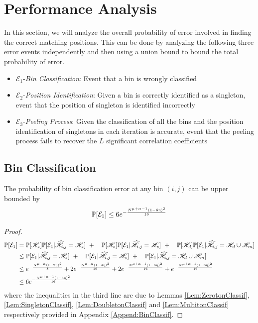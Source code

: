 \section{Performance Analysis}
\label{sec:analysis}
\def\vgap{2pt}
In this section, we will analyze the overall probability of error involved in finding the correct matching positions. This can be done by analyzing the following three error events independently and then using a union bound to bound the total probability of error.

\begin{itemize}
	\item $\mathcal{E}_1${-\it Bin Classification}: Event that a bin is wrongly classified
	\item $\mathcal{E}_2${-\it Position Identification}: Given a bin is correctly identified as a singleton, event that the position of singleton is identified incorrectly
	\item $\mathcal{E}_3${-\it Peeling Process}: Given the classification of all the bins and the position identification of singletons in each iteration is accurate, event that the peeling process fails to recover the $L$ significant correlation coefficients
\end{itemize}

\subsection{\bf Bin Classification}
\begin{lemma}
The probability of bin classification error at any bin $(i,j)$ can be upper bounded by
\begin{align*}
\mathbb{P}[\mathcal{E}_1]\leq 6e^{-\frac{N^{\mu+\alpha-1}(1-6\eta)^2}{16}}
\end{align*}
\end{lemma}

\begin{proof}
\begin{align*}
\mathbb{P}[\mathcal{E}_1]&=\mathbb{P}[\mathscr{H}_z]\mathbb{P}[\mathcal{E}_1|\widehat{\mathscr{H}}_{i,j}=\mathscr{H}_z]~+
						\quad \mathbb{P}[\mathscr{H}_s]\mathbb{P}[\mathcal{E}_1|\widehat{\mathscr{H}}_{i,j}=\mathscr{H}_s]~+
						\quad\mathbb{P}[\mathscr{H}_d]\mathbb{P}[\mathcal{E}_1|\widehat{\mathscr{H}}_{i,j}=\mathscr{H}_d \cup \mathscr{H}_m]\\
				&\leq \mathbb{P}[\mathcal{E}_1|\widehat{\mathscr{H}}_{i,j}=\mathscr{H}_z]~+
						\quad \mathbb{P}[\mathcal{E}_1|\widehat{\mathscr{H}}_{i,j}=\mathscr{H}_s]~+
						\quad \mathbb{P}[\mathcal{E}_1|\widehat{\mathscr{H}}_{i,j}=\mathscr{H}_d \cup \mathscr{H}_m]\\
    			&\leq  e^{-\frac{N^{\mu-\alpha}(1-2\eta)^2}{8}}+2e^{-\frac{N^{\mu-\alpha}(1-4\eta)^2}{16}}+ 2e^{-\frac{N^{\mu+\alpha-1}(1-6\eta)^2}{16}}+e^{-\frac{N^{\mu+\alpha-1}(1-6\eta)^2}{16}}\\
    			&\leq 6e^{-\frac{N^{\mu+\alpha-1}(1-6\eta)^2}{16}}\\
						\end{align*}
						where the inequalities in the third line are due to Lemmas \ref{Lem:ZerotonClassif}, \ref{Lem:SingletonClassif}, \ref{Lem:DoubletonClassif} and \ref{Lem:MultitonClassif} respectively provided in Appendix \ref{Append:BinClassif}.
\end{proof}

